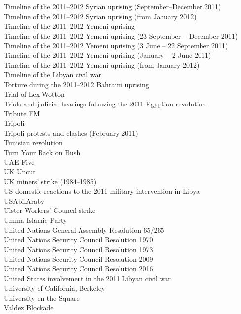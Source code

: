 Timeline of the 2011–2012 Syrian uprising (September–December 2011)\\
Timeline of the 2011–2012 Syrian uprising (from January 2012)\\
Timeline of the 2011–2012 Yemeni uprising\\
Timeline of the 2011–2012 Yemeni uprising (23 September – December 2011)\\
Timeline of the 2011–2012 Yemeni uprising (3 June – 22 September 2011)\\
Timeline of the 2011–2012 Yemeni uprising (January – 2 June 2011)\\
Timeline of the 2011–2012 Yemeni uprising (from January 2012)\\
Timeline of the Libyan civil war\\
Torture during the 2011–2012 Bahraini uprising\\
Trial of Lex Wotton\\
Trials and judicial hearings following the 2011 Egyptian revolution\\
Tribute FM\\
Tripoli\\
Tripoli protests and clashes (February 2011)\\
Tunisian revolution\\
Turn Your Back on Bush\\
UAE Five\\
UK Uncut\\
UK miners' strike (1984–1985)\\
US domestic reactions to the 2011 military intervention in Libya\\
USAbilAraby\\
Ulster Workers' Council strike\\
Umma Islamic Party\\
United Nations General Assembly Resolution 65/265\\
United Nations Security Council Resolution 1970\\
United Nations Security Council Resolution 1973\\
United Nations Security Council Resolution 2009\\
United Nations Security Council Resolution 2016\\
United States involvement in the 2011 Libyan civil war\\
University of California, Berkeley\\
University on the Square\\
Valdez Blockade\\
